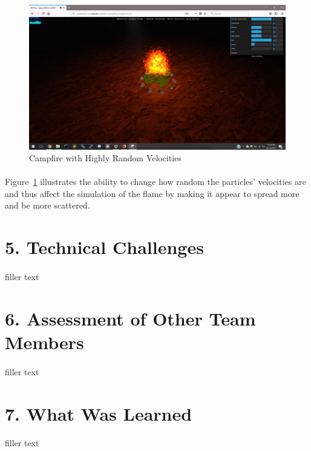 \documentclass[letterpaper]{article}
\begin{document}
\begin{figure}[H]
\centering
\includegraphics[scale=.35]{result9.JPG}
\caption{Campfire with Highly Random Velocities}
\label{fig:result9}
\end{figure}
\paragraph{}
Figure~\ref{fig:result9} illustrates the ability to change how random the particles' velocities are and thus affect the simulation of the flame by making it appear to spread more and be more scattered.


\section*{5. Technical Challenges}

\paragraph*{}
    filler text

\section*{6. Assessment of Other Team Members}

\paragraph*{}
    filler text
\section*{7. What Was Learned}

\paragraph*{}
    filler text
\end{document}
